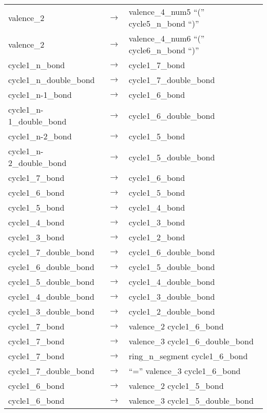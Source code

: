 \documentclass[../Document.tex]{subfiles}
\begin{document}
\begin{longtable}{m{} p{} p{}}
    valence\_2 & $\rightarrow$ & valence\_4\_num5 ``('' cycle5\_n\_bond ``)'' \\
    valence\_2 & $\rightarrow$ & valence\_4\_num6 ``('' cycle6\_n\_bond ``)'' \\
    cycle1\_n\_bond & $\rightarrow$ & cycle1\_7\_bond \\
    cycle1\_n\_double\_bond & $\rightarrow$ & cycle1\_7\_double\_bond \\
    cycle1\_n-1\_bond & $\rightarrow$ & cycle1\_6\_bond \\
    cycle1\_n-1\_double\_bond & $\rightarrow$ & cycle1\_6\_double\_bond \\
    cycle1\_n-2\_bond & $\rightarrow$ & cycle1\_5\_bond \\
    cycle1\_n-2\_double\_bond & $\rightarrow$ & cycle1\_5\_double\_bond \\
    cycle1\_7\_bond & $\rightarrow$ & cycle1\_6\_bond \\
    cycle1\_6\_bond & $\rightarrow$ & cycle1\_5\_bond \\
    cycle1\_5\_bond & $\rightarrow$ & cycle1\_4\_bond \\
    cycle1\_4\_bond & $\rightarrow$ & cycle1\_3\_bond \\
    cycle1\_3\_bond & $\rightarrow$ & cycle1\_2\_bond \\
    cycle1\_7\_double\_bond & $\rightarrow$ & cycle1\_6\_double\_bond \\
    cycle1\_6\_double\_bond & $\rightarrow$ & cycle1\_5\_double\_bond \\
    cycle1\_5\_double\_bond & $\rightarrow$ & cycle1\_4\_double\_bond \\
    cycle1\_4\_double\_bond & $\rightarrow$ & cycle1\_3\_double\_bond \\
    cycle1\_3\_double\_bond & $\rightarrow$ & cycle1\_2\_double\_bond \\
    cycle1\_7\_bond & $\rightarrow$ & valence\_2 cycle1\_6\_bond \\
    cycle1\_7\_bond & $\rightarrow$ & valence\_3 cycle1\_6\_double\_bond \\
    cycle1\_7\_bond & $\rightarrow$ & ring\_n\_segment cycle1\_6\_bond \\
    cycle1\_7\_double\_bond & $\rightarrow$ & ``='' valence\_3 cycle1\_6\_bond \\
    cycle1\_6\_bond & $\rightarrow$ & valence\_2 cycle1\_5\_bond \\
    cycle1\_6\_bond & $\rightarrow$ & valence\_3 cycle1\_5\_double\_bond \\

\end{longtable}
\end{document}
